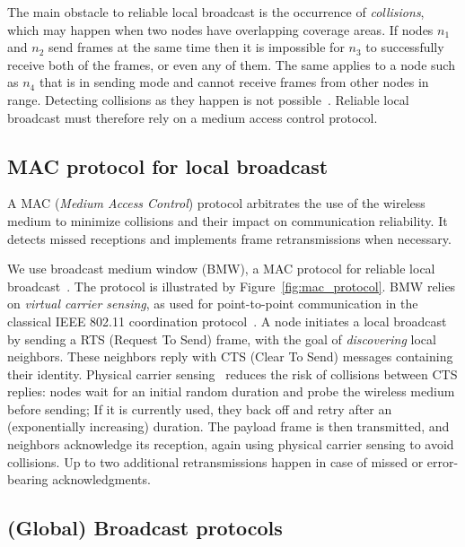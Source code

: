 The main obstacle to reliable local broadcast is the occurrence of \emph{collisions}, which may happen when two nodes have overlapping coverage areas.
If nodes $n_{1}$ and $n_{2}$ send frames at the same time then it is impossible for $n_{3}$ to successfully receive both of the frames, or even any of them.
The same applies to a node such as $n_4$ that is in sending mode and cannot receive frames from other nodes in range.
Detecting collisions as they happen is not possible~\cite{ieee1997wireless}.
Reliable local broadcast must therefore rely on a medium access control protocol.

\subsection{MAC protocol for local broadcast}
\label{sec:background:mac}

A MAC (\emph{Medium Access Control}) protocol arbitrates the use of the wireless medium to minimize collisions and their impact on communication reliability.
It detects missed receptions and implements frame retransmissions when necessary.

We use broadcast medium window (BMW), a MAC protocol for reliable local broadcast~\cite{tang2001mac}.
The protocol is illustrated by Figure~\ref{fig:mac_protocol}.
BMW relies on \emph{virtual carrier sensing}, as used for point-to-point communication in the classical IEEE 802.11 coordination protocol~\cite{ieee1997wireless}.
A node initiates a local broadcast by sending a RTS (Request To Send) frame, with the goal of \emph{discovering} local neighbors.
These neighbors reply with CTS (Clear To Send) messages containing their identity.
Physical carrier sensing~\cite{ieee1997wireless} reduces the risk of collisions between CTS replies:
nodes wait for an initial random duration and probe the wireless medium before sending; If it is currently used, they back off and retry after an (exponentially increasing) duration.
The payload frame is then transmitted, and neighbors acknowledge its reception, again using physical carrier sensing to avoid collisions.
Up to two additional retransmissions happen in case of missed or error-bearing acknowledgments.

\subsection{(Global) Broadcast protocols}
\label{sec:background:broadcast}

